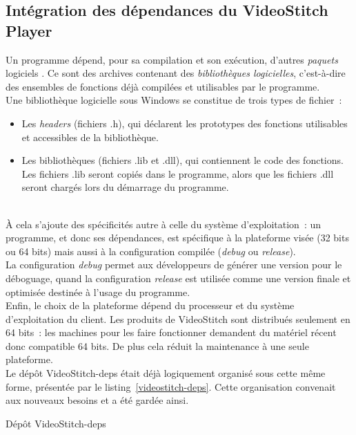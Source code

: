 \subsection{Intégration des dépendances du VideoStitch Player}
\label{integration-dependances-player}
Un programme dépend, pour sa compilation et son exécution, d'autres \emph{paquets} logiciels
\cite{dependance-logicielle}. Ce sont des archives contenant des \emph{bibliothèques logicielles},
c'est-à-dire des ensembles de fonctions déjà compilées et utilisables par le programme.\\
Une bibliothèque logicielle sous Windows se constitue de trois types de fichier\cite{bibliotheque-logicielle}~:
\begin{itemize}
  \item Les \textit{headers} (fichiers .h), qui déclarent les prototypes des fonctions utilisables
  et accessibles de la bibliothèque.
  \item Les bibliothèques (fichiers .lib et .dll), qui contiennent le code des fonctions.
  Les fichiers .lib seront copiés dans le programme, alors que les fichiers .dll seront
  chargés lors du démarrage du programme\cite{bibliotheque-logicielle}.
\end{itemize}
\ \\
À cela s'ajoute des spécificités autre à celle du système d'exploitation~: un programme, et donc
ses dépendances, est spécifique à la plateforme visée (32 bits ou 64 bits)\cite{64-bit-computing}
mais aussi à la configuration compilée (\textit{debug} ou \textit{release})\cite{msdn-debug-release}.\\
La configuration \textit{debug} permet aux développeurs de générer une version pour le déboguage,
quand la configuration \textit{release} est utilisée comme une version finale et optimisée destinée
à l'usage du programme.\\
Enfin, le choix de la plateforme dépend du processeur et du
système d'exploitation du client. Les produits de VideoStitch sont distribués
seulement en 64 bits~: les machines pour les faire fonctionner demandent du matériel
récent donc compatible 64 bits. De plus cela réduit la maintenance à une seule plateforme.\\
\newline
Le dépôt VideoStitch-deps était déjà logiquement organisé sous cette même forme,
présentée par le listing~\ref{videostitch-deps}.
Cette organisation convenait aux nouveaux besoins et a été gardée ainsi. 
\begin{listing}
  \caption{Dépôt VideoStitch-deps}
  \label{videostitch-deps}
\end{listing}
